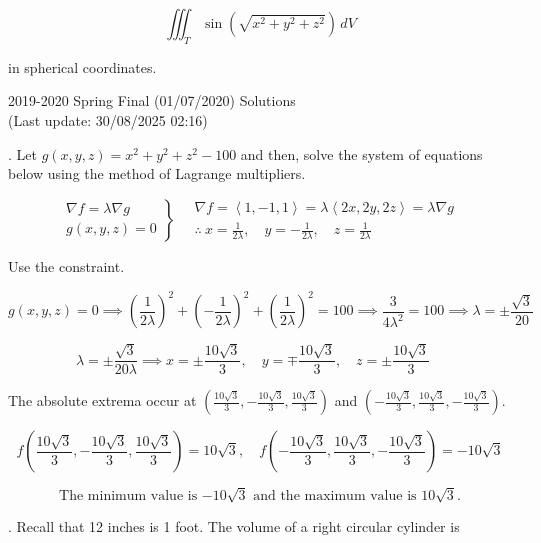\documentclass{article}
\begin{document}
\[\iiint_T\sin\left(\sqrt{x^2+y^2+z^2}\right)\,dV\]

\hfill

\noindent in spherical coordinates.

\newpage

\begin{center}
2019-2020 Spring Final (01/07/2020) Solutions\\
(Last update: 30/08/2025 02:16)
\end{center}

. Let $g(x,y,z)=x^2+y^2+z^2-100$ and then, solve the system of equations below using the method of Lagrange multipliers.

\[
\left.
\begin{array}{l}
\displaystyle\nabla f=\lambda\nabla g\\
\displaystyle g(x,y,z)=0
\end{array}
\right\}\quad\begin{array}{c}
\nabla f=\left\langle1,-1,1\right\rangle=\lambda\left\langle2x,2y,2z\right\rangle=\lambda\nabla g\\[1em]\displaystyle\therefore\: x=\frac1{2\lambda},\quad y=-\frac1{2\lambda},\quad z=\frac1{2\lambda}
\end{array}
\]

\hfill

\noindent Use the constraint.

\[g(x,y,z)=0\implies\left(\frac1{2\lambda}\right)^2+\left(-\frac1{2\lambda}\right)^2+\left(\frac1{2\lambda}\right)^2=100\implies\frac3{4\lambda^2}=100\implies\lambda=\pm\frac{\sqrt3}{20}\]

\[\lambda=\pm\frac{\sqrt3}{20\lambda}\implies x=\pm\frac{10\sqrt3}3,\quad y=\mp\frac{10\sqrt3}3,\quad z=\pm\frac{10\sqrt3}3\quad\]

\hfill

\noindent The absolute extrema occur at $\left(\frac{10\sqrt3}3,-\frac{10\sqrt3}3,\frac{10\sqrt3}3\right)$ and $\left(-\frac{10\sqrt3}3,\frac{10\sqrt3}3,-\frac{10\sqrt3}3\right)$.

\[f\left(\frac{10\sqrt3}3,-\frac{10\sqrt3}3,\frac{10\sqrt3}3\right)=10\sqrt3,\quad f\left(-\frac{10\sqrt3}3,\frac{10\sqrt3}3,-\frac{10\sqrt3}3\right)=-10\sqrt3\]

\[\boxed{\text{The minimum value is }{-10\sqrt3}\text{ and the maximum value is }10\sqrt3.}\]

\hfill

. Recall that 12 inches is 1 foot. The volume of a right circular cylinder is
\end{document}
